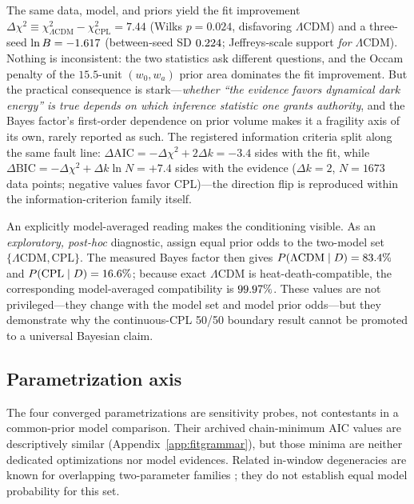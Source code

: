 \documentclass[a4paper,11pt]{article}
\newcommand{\lcdm}{\ensuremath{\Lambda\mathrm{CDM}}}
\newcommand{\wz}{\ensuremath{w_0}}
\newcommand{\wa}{\ensuremath{w_a}}
\begin{document}
The same data, model, and priors yield the fit improvement
$\Delta\chi^2\equiv\chi^2_{\lcdm{}}-\chi^2_{\mathrm{CPL}}=7.44$ (Wilks
$p=0.024$, disfavoring \lcdm) and a three-seed
$\ln B=-1.617$ (between-seed SD $0.224$; Jeffreys-scale
support \emph{for} \lcdm). Nothing is inconsistent: the two statistics ask
different questions, and the Occam penalty of the $15.5$-unit $(\wz,\wa)$
prior area dominates the fit improvement. But the practical consequence is
stark---\emph{whether ``the evidence favors dynamical dark energy'' is
true depends on which inference statistic one grants authority}, and the Bayes
factor's first-order dependence on prior volume makes it a fragility axis of
its own, rarely reported as such. The registered information criteria split
along the same fault line: $\Delta\mathrm{AIC}=-\Delta\chi^2+2\Delta k=-3.4$
sides with the fit, while
$\Delta\mathrm{BIC}=-\Delta\chi^2+\Delta k\ln N=+7.4$ sides with the
evidence ($\Delta k=2$, $N=1673$ data points; negative values favor
CPL)---the direction flip is reproduced within the information-criterion
family itself.

An explicitly model-averaged reading makes the conditioning visible. As an
\emph{exploratory, post-hoc} diagnostic, assign equal prior odds to the
two-model set $\{\lcdm{},\mathrm{CPL}\}$. The measured Bayes factor then gives
$P(\lcdm{}\mid D)=\ModelAvgLCDMPct\%$ and
$P(\mathrm{CPL}\mid D)=16.6\%$; because exact
\lcdm{} is heat-death-compatible, the corresponding model-averaged
compatibility is $99.97\%$. These values are not privileged---they change
with the model set and model prior odds---but they demonstrate why the
continuous-CPL 50/50 boundary result cannot be promoted to a universal
Bayesian claim.

\subsection{Parametrization axis}\label{sec:fparam}

The four converged parametrizations are sensitivity probes, not contestants
in a common-prior model comparison. Their archived chain-minimum AIC values
are descriptively similar (Appendix~\ref{app:fitgrammar}), but those minima
are neither dedicated optimizations nor model evidences. Related in-window
degeneracies are known for overlapping two-parameter families
\cite{Wolf2025}; they do not establish equal model probability for this set.
\end{document}
